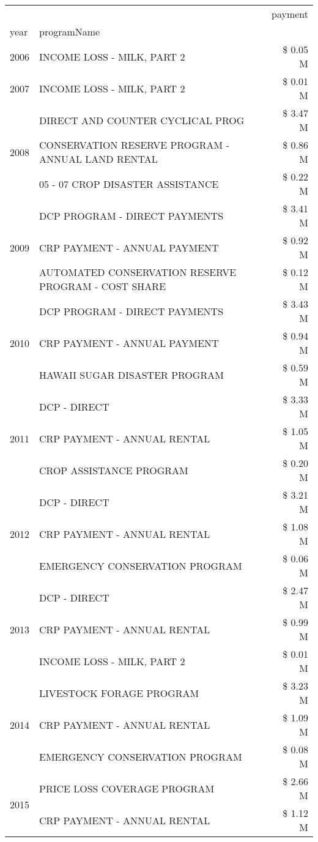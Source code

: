 \begin{tabular}{llr}
\toprule
 &  & payment \\
year & programName &  \\
\midrule
2006 & INCOME LOSS - MILK, PART 2 & \$ 0.05 M \\
\cline{1-3}
2007 & INCOME LOSS - MILK, PART 2 & \$ 0.01 M \\
\cline{1-3}
\multirow[t]{3}{*}{2008} & DIRECT AND COUNTER CYCLICAL PROG & \$ 3.47 M \\
 & CONSERVATION RESERVE PROGRAM - ANNUAL LAND RENTAL & \$ 0.86 M \\
 & 05 - 07 CROP DISASTER ASSISTANCE & \$ 0.22 M \\
\cline{1-3}
\multirow[t]{3}{*}{2009} & DCP PROGRAM - DIRECT PAYMENTS & \$ 3.41 M \\
 & CRP PAYMENT - ANNUAL PAYMENT & \$ 0.92 M \\
 & AUTOMATED CONSERVATION RESERVE PROGRAM - COST SHARE & \$ 0.12 M \\
\cline{1-3}
\multirow[t]{3}{*}{2010} & DCP PROGRAM - DIRECT PAYMENTS & \$ 3.43 M \\
 & CRP PAYMENT - ANNUAL PAYMENT & \$ 0.94 M \\
 & HAWAII SUGAR DISASTER PROGRAM & \$ 0.59 M \\
\cline{1-3}
\multirow[t]{3}{*}{2011} & DCP - DIRECT & \$ 3.33 M \\
 & CRP PAYMENT - ANNUAL RENTAL & \$ 1.05 M \\
 & CROP ASSISTANCE PROGRAM & \$ 0.20 M \\
\cline{1-3}
\multirow[t]{3}{*}{2012} & DCP - DIRECT & \$ 3.21 M \\
 & CRP PAYMENT - ANNUAL RENTAL & \$ 1.08 M \\
 & EMERGENCY CONSERVATION PROGRAM & \$ 0.06 M \\
\cline{1-3}
\multirow[t]{3}{*}{2013} & DCP - DIRECT & \$ 2.47 M \\
 & CRP PAYMENT - ANNUAL RENTAL & \$ 0.99 M \\
 & INCOME LOSS - MILK, PART 2 & \$ 0.01 M \\
\cline{1-3}
\multirow[t]{3}{*}{2014} & LIVESTOCK FORAGE PROGRAM & \$ 3.23 M \\
 & CRP PAYMENT - ANNUAL RENTAL & \$ 1.09 M \\
 & EMERGENCY CONSERVATION PROGRAM & \$ 0.08 M \\
\cline{1-3}
\multirow[t]{3}{*}{2015} & PRICE LOSS COVERAGE PROGRAM & \$ 2.66 M \\
 & CRP PAYMENT - ANNUAL RENTAL & \$ 1.12 M \\

\end{tabular}
